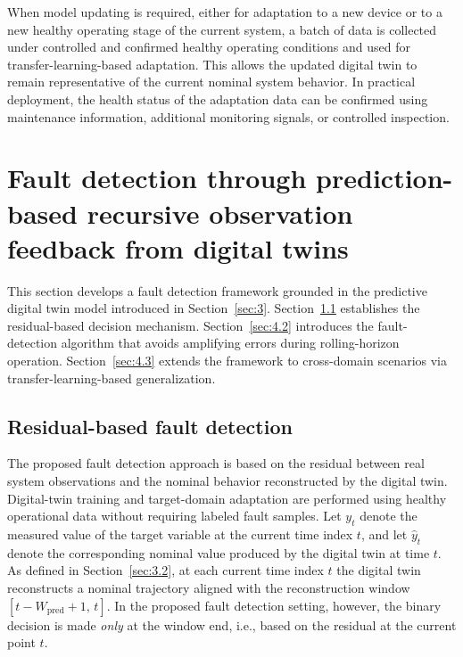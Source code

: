 \documentclass[a4paper,10pt]{cas-sc}%
\newcommand{\roundtworev}[1]{\textcolor{roundtwored}{#1}}
\begin{document}
\roundtworev{When model updating is required, either for adaptation to a new device or to a new healthy operating stage of the current system, a batch of data is collected under controlled and confirmed healthy operating conditions and used for transfer-learning-based adaptation. This allows the updated digital twin to remain representative of the current nominal system behavior. In practical deployment, the health status of the adaptation data can be confirmed using maintenance information, additional monitoring signals, or controlled inspection.}

\section{Fault detection through prediction-based recursive observation feedback from digital twins}\label{sec:4}

This section develops a fault detection framework grounded in the predictive digital twin model introduced in Section~\ref{sec:3}.
Section~\ref{sec:4.1} establishes the residual-based decision mechanism.
Section~\ref{sec:4.2} introduces the fault-detection algorithm that avoids amplifying errors during rolling-horizon operation.
Section~\ref{sec:4.3} extends the framework to cross-domain scenarios via transfer-learning-based generalization.

\subsection{Residual-based fault detection}\label{sec:4.1}

\roundtworev{The proposed fault detection approach is based on the residual between real system observations and the nominal behavior reconstructed by the digital twin. Digital-twin training and target-domain adaptation are performed using healthy operational data without requiring labeled fault samples.} Let $y_t$ denote the measured value of the target variable at the current time index $t$, and let $\hat{y}_t$ denote the corresponding nominal value produced by the digital twin at time $t$. As defined in Section~\ref{sec:3.2}, at each current time index $t$ the digital twin reconstructs a nominal trajectory aligned with the reconstruction window $[t-W_{\mathrm{pred}}+1,\,t]$. In the proposed fault detection setting, however, the binary decision is made \emph{only} at the window end, i.e., based on the residual at the current point $t$.
\end{document}
